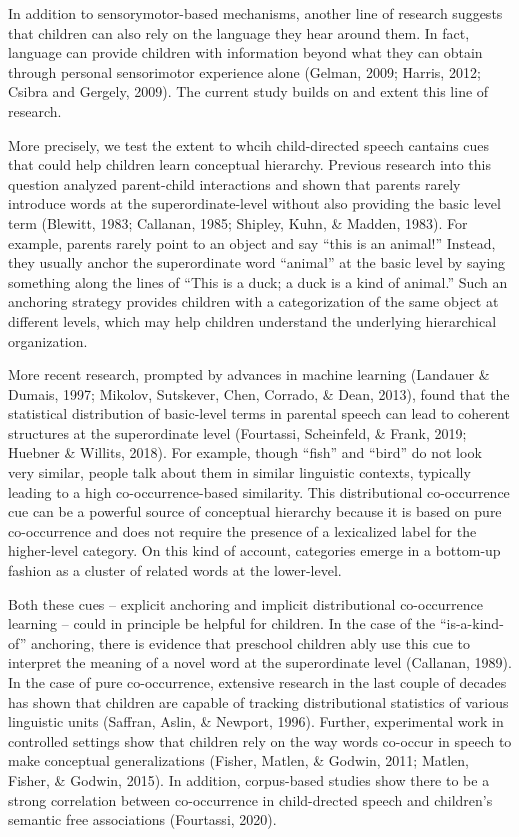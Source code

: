 \documentclass[english,,man,floatsintext]{apa6}
\begin{document}
In addition to sensorymotor-based mechanisms, another line of research suggests that children can also rely on the language they hear around them. In fact, language can provide children with information beyond what they can obtain through personal sensorimotor experience alone (Gelman, 2009; Harris, 2012; Csibra and Gergely, 2009). The current study builds on and extent this line of research.

More precisely, we test the extent to whcih child-directed speech cantains cues that could help children learn conceptual hierarchy. Previous research into this question analyzed parent-child interactions and shown that parents rarely introduce words at the superordinate-level without also providing the basic level term (Blewitt, 1983; Callanan, 1985; Shipley, Kuhn, \& Madden, 1983). For example, parents rarely point to an object and say \enquote{this is an animal!} Instead, they usually anchor the superordinate word \enquote{animal} at the basic level by saying something along the lines of \enquote{This is a duck; a duck is a kind of animal.} Such an anchoring strategy provides children with a categorization of the same object at different levels, which may help children understand the underlying hierarchical organization.

More recent research, prompted by advances in machine learning (Landauer \& Dumais, 1997; Mikolov, Sutskever, Chen, Corrado, \& Dean, 2013), found that the statistical distribution of basic-level terms in parental speech can lead to coherent structures at the superordinate level (Fourtassi, Scheinfeld, \& Frank, 2019; Huebner \& Willits, 2018). For example, though \enquote{fish} and \enquote{bird} do not look very similar, people talk about them in similar linguistic contexts, typically leading to a high co-occurrence-based similarity. This distributional co-occurrence cue can be a powerful source of conceptual hierarchy because it is based on pure co-occurrence and does not require the presence of a lexicalized label for the higher-level category. On this kind of account, categories emerge in a bottom-up fashion as a cluster of related words at the lower-level.

Both these cues -- explicit anchoring and implicit distributional co-occurrence learning -- could in principle be helpful for children. In the case of
the \enquote{is-a-kind-of} anchoring, there is evidence that preschool children ably use this cue to interpret the meaning of a novel word at the superordinate level (Callanan, 1989). In the case of pure co-occurrence, extensive research in the last couple of decades has shown that children are capable of tracking distributional statistics of various linguistic units (Saffran, Aslin, \& Newport, 1996). Further, experimental work in controlled settings show that children rely on the way words co-occur in speech to make conceptual generalizations (Fisher, Matlen, \& Godwin, 2011; Matlen, Fisher, \& Godwin, 2015). In addition, corpus-based studies show there to be a strong correlation between co-occurrence in child-drected speech and children's semantic free associations (Fourtassi, 2020).
\end{document}
